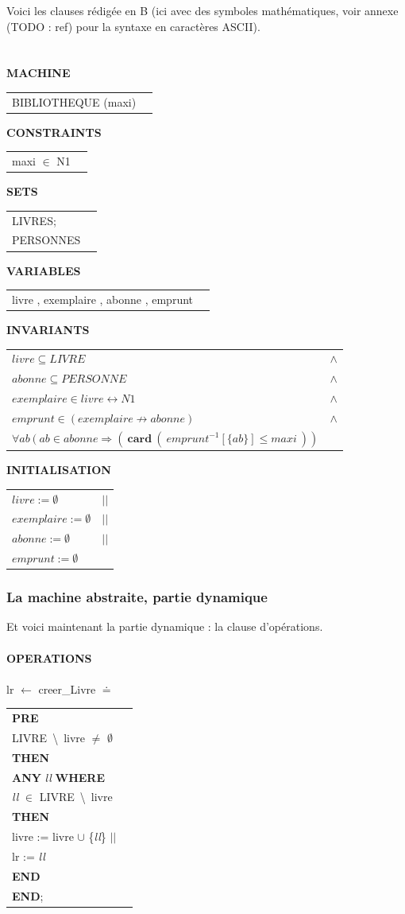 \documentclass[10pt,a4paper]{article}
\begin{document}
Voici les clauses rédigée en B (ici avec des symboles mathématiques, voir annexe (TODO : ref) pour la syntaxe en caractères ASCII).
\\
\\
\\
\setlength{\LTpre}{\medskipamount} %
\setlength{\LTpost}{0pt}
\setlength\LTleft{\parindent}
\textbf{MACHINE}
\begin{longtable}{ll} BIBLIOTHEQUE (maxi) \end{longtable}
\noindent\textbf{CONSTRAINTS}
\begin{longtable}{ll} maxi $\in$ N1 \end{longtable}
\noindent\textbf{SETS}
\begin{longtable}{ll} LIVRES; \\ PERSONNES\\ \end{longtable}
\noindent\textbf{VARIABLES}
\begin{longtable}{ll} livre , exemplaire , abonne , emprunt \end{longtable}
\noindent\textbf{INVARIANTS}
\begin{longtable}{ll}
$livre \subseteq LIVRE $ & $\wedge$ \tabularnewline
$abonne \subseteq PERSONNE$ & $\wedge$ \tabularnewline
$exemplaire \in livre \leftrightarrow N1$ & $\wedge$ \tabularnewline
$emprunt \in ( exemplaire \nrightarrow abonne )$ & $\wedge$ \tabularnewline
$\forall ab\ (\ ab \in abonne \Rightarrow (\ \textbf{card}\ (\ emprunt ^{-1}[\{ab\}] \leq maxi\ ))$ &
\end{longtable}
\noindent\textbf{INITIALISATION}
\begin{longtable}{ll}
$livre := \emptyset$ & $||$ \tabularnewline
$exemplaire := \emptyset$ & $||$ \tabularnewline
$abonne := \emptyset$ & $||$ \tabularnewline
$emprunt := \emptyset$ &
\end{longtable}

\subsubsection{La machine abstraite, partie dynamique}

Et voici maintenant la partie dynamique : la clause d'opérations.
\\
\\
\noindent \textbf{OPERATIONS}\\ \\
\indent lr $\leftarrow$ creer\_Livre $\doteq$
\begin{longtable}{ll} \textbf{PRE} \tabularnewline
\indent LIVRE\ \textbackslash \ livre $\neq$ $\emptyset$ \tabularnewline
\textbf{THEN} \tabularnewline
\indent \textbf{ANY} \emph{ll} \textbf{WHERE} \tabularnewline \indent \indent \emph{ll} $\in$ LIVRE\ \textbackslash \ livre \tabularnewline
\indent \textbf{THEN} \tabularnewline
\indent \indent livre := livre $\cup$ \{\emph{ll}\} $||$ \tabularnewline
\indent \indent lr := \emph{ll} \tabularnewline
\indent \textbf{END} \tabularnewline
\textbf{END};
\end{longtable}
\end{document}
